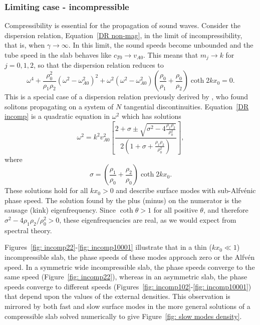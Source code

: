 \subsubsection{Limiting case - incompressible} \label{sec: incomp}

Compressibility is essential for the propagation of sound waves. Consider the dispersion relation, Equation~\eqref{DR non-mag}, in the limit of incompressibility, that is, when $\gamma \to \infty$. In this limit, the sound speeds become unbounded and the tube speed in the slab behaves like $c_{T0} \to {v_{A0}}$. This means that $m_j \to {k}$ for $j = 0, 1, 2$, so that the dispersion relation reduces to
\begin{equation}
\omega^4 + \frac{\rho_0^2}{\rho_1\rho_2}(\omega^2 - \omega_{A0}^2)^2 + \omega^2(\omega^2 - \omega_{A0}^2)\left(\frac{\rho_0}{\rho_1} + \frac{\rho_0}{\rho_2}\right) \coth{2kx_0} = 0. \label{DR incomp}
\end{equation}
This is a special case of a dispersion relation previously derived by \cite{rud92}, who found solitons propagating on a system of $N$ tangential discontinuities. Equation~\eqref{DR incomp} is a quadratic equation in $\omega^2$ which has solutions
\begin{equation}
\omega^2 = k^2v_{A0}^2\left[\frac{2 + \sigma \pm \sqrt{\sigma^2 - 4\frac{\rho_1\rho_2}{\rho_0^2}}}{2\left(1 + \sigma + \frac{\rho_1\rho_2}{\rho_0^2}\right)}\right],
\end{equation}
where
\begin{equation}
\sigma = \left(\frac{\rho_1}{\rho_0} + \frac{\rho_2}{\rho_0}\right)\coth{2kx_0}.
\end{equation}
These solutions hold for all $kx_0 > 0$ and describe surface modes with sub-Alfv\'enic phase speed. The solution found by the plus (minus) on the numerator is the sausage (kink) eigenfrequency. Since $\coth{\theta} > 1$ for all positive $\theta$, and therefore $\sigma^2 - 4\rho_1\rho_2/\rho_0^2 > 0$, these eigenfrequencies are real, as we would expect from spectral theory.

Figures~\ref{fig: incomp22}-\ref{fig: incomp10001} illustrate that in a thin ($kx_0 \ll 1$) incompressible slab, the phase speeds of these modes approach zero or the Alfv\'{e}n speed. In a symmetric wide incompressible slab, the phase speeds converge to the same speed (Figure~\ref{fig: incomp22}), whereas in an asymmetric slab, the phase speeds converge to different speeds (Figures~\ref{fig: incomp102}-\ref{fig: incomp10001}) that depend upon the values of the external densities. This observation is mirrored by both fast and slow surface modes in the more general solutions of a compressible slab solved numerically to give Figure~\ref{fig: slow modes density}.

